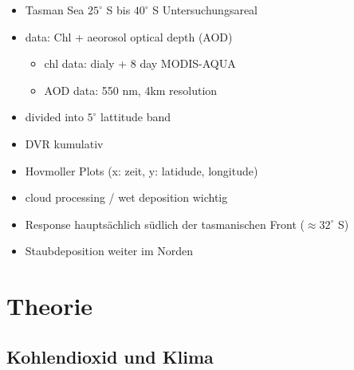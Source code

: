 \documentclass[12pt,a4paper,onecolumn]{scrartcl}
\begin{document}
\begin{itemize}
\item Tasman Sea $25^\circ$ S bis $40^\circ$ S Untersuchungsareal
\item data: Chl + aeorosol optical depth (AOD)
\begin{itemize}
\item chl data: dialy + 8 day MODIS-AQUA
\item AOD data: 550 nm, 4km resolution 
\end{itemize}
\item divided into $5^\circ$ lattitude band
\item DVR kumulativ
\item Hovmoller Plots (x: zeit, y: latidude, longitude)
\item cloud processing / wet deposition wichtig
\item Response hauptsächlich südlich der tasmanischen Front ($\approx 32^\circ$ S) 
\item Staubdeposition weiter im Norden

\end{itemize}

\section{Theorie}
\subsection{Kohlendioxid und Klima}
\end{document}
